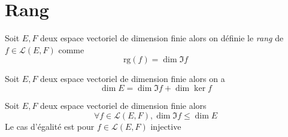\documentclass[11pt,colorlinks]{book}
\theoremstyle{mytheoremstyle}
\theoremstyle{mytheoremstyle}
\theoremstyle{mytheoremstyle}
\theoremstyle{mytheoremstyle}
\theoremstyle{mytheoremstyle}
\theoremstyle{mytheoremstyle}
\theoremstyle{mytheoremstyle}
\theoremstyle{mytheoremstyle}
\theoremstyle{myproblemstyle}
\def\mfc#1{\mathcal{#1}}
\def\ev{espace vectoriel }
\def\mor{\mfc{L}(E,F)}
\begin{document}
\section{Rang}
\begin{definition}
  Soit $E,F$ deux \ev de dimension finie alors on définie le \textit{rang} de $f \in \mor$ comme 
  \begin{equation*}
    \text{rg}(f) = \dim \Im f
  \end{equation*}
\end{definition}
\begin{theorem}
  Soit $E,F$ deux \ev de dimension finie alors on a 
  \begin{equation*}
    \dim E = \dim \Im f + \dim \ker f
  \end{equation*}
\end{theorem}
\begin{prop}[Corollaire]
  Soit $E,F$ deux \ev de dimension finie alors
  \begin{equation*}
    \forall f \in \mor, \dim \Im f \leq \dim E
  \end{equation*}
  Le cas d'égalité est pour $f \in \mor$ injective
\end{prop}
\end{document}
